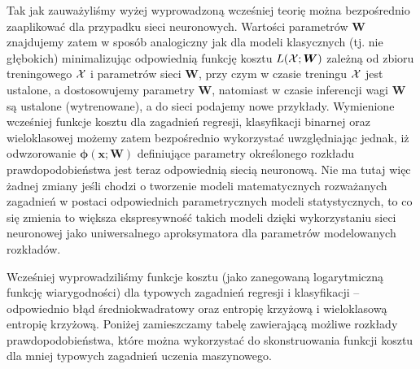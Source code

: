 \documentclass{myclass}
\numberwithin{equation}{subsection}
\begin{document}
Tak jak zauważyliśmy wyżej wyprowadzoną wcześniej teorię można bezpośrednio zaaplikować dla
przypadku sieci neuronowych. Wartości parametrów \(\bm{W}\) znajdujemy zatem w sposób analogiczny
jak dla modeli klasycznych (tj. nie głębokich) minimalizując odpowiednią funkcję kosztu \(L(\mathcal{X};
\bm{W})\) zależną od zbioru treningowego \(\mathcal{X}\) i parametrów sieci \(\bm{W}\), przy czym w
czasie treningu \(\mathcal{X}\) jest ustalone, a dostosowujemy parametry \(\bm{W}\), natomiast w czasie
inferencji wagi \(\bm{W}\) są ustalone (wytrenowane), a do sieci podajemy nowe przykłady. Wymienione
wcześniej funkcje kosztu dla zagadnień regresji, klasyfikacji binarnej oraz wieloklasowej możemy
zatem bezpośrednio wykorzystać uwzględniając jednak, iż odwzorowanie \(\bm{\phi}(\bm{x}; \bm{W})\)
definiujące parametry określonego rozkładu prawdopodobieństwa jest teraz odpowiednią siecią
neuronową. Nie ma tutaj więc żadnej zmiany jeśli chodzi o tworzenie modeli matematycznych
rozważanych zagadnień w postaci odpowiednich parametrycznych modeli statystycznych, to co się
zmienia to większa ekspresywność takich modeli dzięki wykorzystaniu sieci neuronowej jako
uniwersalnego aproksymatora dla parametrów modelowanych rozkładów.

Wcześniej wyprowadziliśmy funkcje kosztu (jako zanegowaną logarytmiczną funkcję wiarygodności) dla
typowych zagadnień regresji i klasyfikacji -- odpowiednio błąd średniokwadratowy oraz entropię
krzyżową i wieloklasową entropię krzyżową. Poniżej zamieszczamy tabelę zawierającą możliwe rozkłady
prawdopodobieństwa, które można wykorzystać do skonstruowania funkcji kosztu dla mniej typowych
zagadnień uczenia maszynowego.
\end{document}
